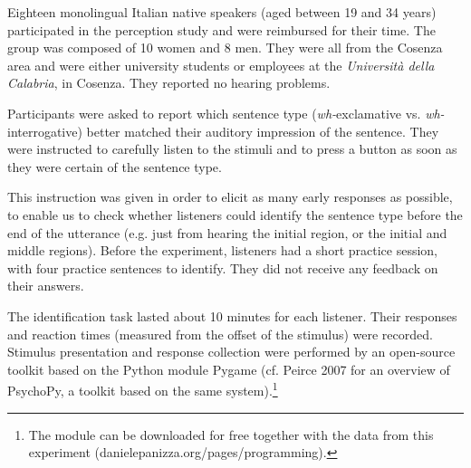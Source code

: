\documentclass[output=paper]{langsci/langscibook}
\begin{document}
Eighteen monolingual Italian native speakers (aged between 19 and 34 years) participated in the perception study and were reimbursed for their time. The group was composed of 10 women and 8 men. They were all from the Cosenza area and were either university students or employees at the \textit{Università della Calabria}, in Cosenza. They reported no hearing problems.

Participants were asked to report which sentence type (\textit{wh-}exclamative vs. \textit{wh-}interrogative) better matched their auditory impression of the sentence. They were instructed to carefully listen to the stimuli and to press a button as soon as they were certain of the sentence type. 

This instruction was given in order to elicit as many early responses as possible, to enable us to check whether listeners could identify the sentence type before the end of the utterance (e.g. just from hearing the initial region, or the initial and middle regions). Before the experiment, listeners had a short practice session, with four practice sentences to identify. They did not receive any feedback on their answers. 

The identification task lasted about 10 minutes for each listener. Their responses and reaction times (measured from the offset of the stimulus) were re\-cor\-ded. Stimulus presentation and response collection were performed by an open-source toolkit based on the Python module Pygame (cf. Peirce 2007 for an overview of PsychoPy, a toolkit based on the same system).\footnote{The module can be downloaded for free together with the data from this experiment (danielepanizza.org/pages/programming).}
\end{document}
